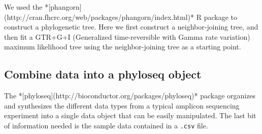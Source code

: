 We used the *[phangorn](http://cran.fhcrc.org/web/packages/phangorn/index.html)* R package  to construct a
phylogenetic tree. Here we first construct a neighbor-joining tree,
and then fit a GTR+G+I (Generalized time-reversible with Gamma rate variation) maximum likelihood tree using the
neighbor-joining tree as a starting point.

\begin{knitrout}
\color{fgcolor}\begin{kframe}
\begin{alltt}
 \hlkwb{<-} \hlstd{(} \hlstd{),} \hlstd{=}\hlstd{)}
 \hlkwb{<-} 
 \hlkwb{<-}  
 \hlkwb{=}  
\end{alltt}


{\ttfamily\noindent\itshape\color{messagecolor}{\#\# negative edges length changed to 0!}}\begin{alltt}
 \hlkwb{<-}  \hlstd{=}\hlstd{,} \hlstd{=}\hlstd{)}
 \hlkwb{<-}  \hlstd{=}\hlstd{,} \hlstd{=}\hlstd{,} \hlstd{=}\hlstd{,}
                     \hlstd{=} \hlstd{,}  \hlstd{=} \hlstd{(} \hlstd{=} \hlstd{))}
\hlstd{(}\hlstd{,} \hlstd{=}\hlstd{)}
\end{alltt}
\end{kframe}
\end{knitrout}

\subsection*{Combine data into a phyloseq object}

The *[phyloseq](http://bioconductor.org/packages/phyloseq)* package
organizes and synthesizes the different data types from a typical
amplicon sequencing experiment into a single data object that can be
easily manipulated. The last bit of information needed is the sample
data contained in a \texttt{.csv} file. 

